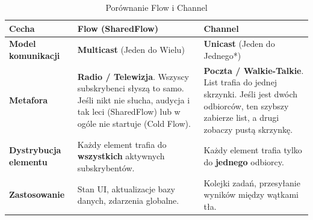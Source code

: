\begin{table}[h]
\centering
\begin{tabularx}{\linewidth}{|l|X|X|}
\hline
\textbf{Cecha} & \textbf{Flow (SharedFlow)} & \textbf{Channel} \\ \hline

\textbf{Model komunikacji} &
\textbf{Multicast} (Jeden do Wielu) &
\textbf{Unicast} (Jeden do Jednego*) \\ \hline

\textbf{Metafora} &
\textbf{Radio / Telewizja}. Wszyscy subskrybenci słyszą to samo. Jeśli nikt nie słucha, audycja i tak leci (SharedFlow) lub w ogóle nie startuje (Cold Flow). &
\textbf{Poczta / Walkie-Talkie}. List trafia do jednej skrzynki. Jeśli jest dwóch odbiorców, ten szybszy zabierze list, a drugi zobaczy pustą skrzynkę. \\ \hline

\textbf{Dystrybucja elementu} &
Każdy element trafia do \textbf{wszystkich} aktywnych subskrybentów. &
Każdy element trafia tylko do \textbf{jednego} odbiorcy. \\ \hline

\textbf{Zastosowanie} &
Stan UI, aktualizacje bazy danych, zdarzenia globalne. &
Kolejki zadań, przesyłanie wyników między wątkami tła. \\ \hline
\end{tabularx}
\caption{Porównanie Flow i Channel}
\end{table}



